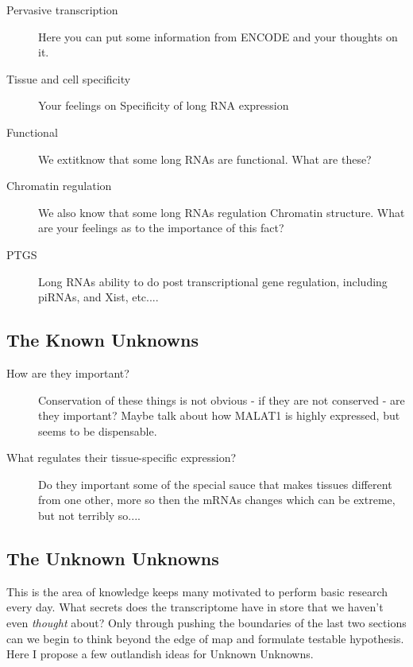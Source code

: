     \begin{description}
      \item[Pervasive transcription]
      Here you can put some information from ENCODE and your thoughts on it.

      \item[Tissue and cell specificity]
      Your feelings on Specificity of long RNA expression

      \item[Functional]
      We   extit{know} that some long RNAs are functional. What are these?

      \item[Chromatin regulation]
      We also know that some long RNAs regulation Chromatin structure. What are your feelings as to the importance of this fact?

      \item[PTGS]
      Long RNAs ability to do post transcriptional gene regulation, including piRNAs, and Xist, etc....

      \end{description}

  \subsection{The Known Unknowns}\label{subsec: The Known Unknowns}

    \begin{description}
      \item[How are they important?] 
      Conservation of these things is not obvious - if they are not conserved - are they important? Maybe talk about how MALAT1 is highly expressed, but seems to be dispensable.

      \item[What regulates their tissue-specific expression?]
      Do they important some of the special sauce that makes tissues different from one other, more so then the mRNAs changes which can be extreme, but not terribly so....

      \item[]  
      \end{description}

  \subsection{The Unknown Unknowns}\label{subsec: The Unknown Unknowns}

    This is the area of knowledge keeps many motivated to perform basic research every day. What secrets does the transcriptome have in store that we haven't even \textit{thought} about? Only through pushing the boundaries of the last two sections can we begin to think beyond the edge of map and formulate testable hypothesis. Here I propose a few outlandish ideas for Unknown Unknowns. 

